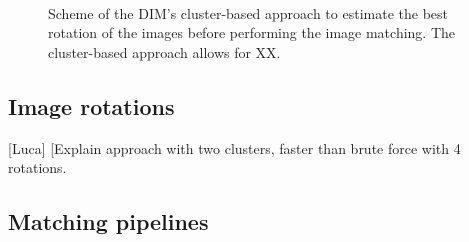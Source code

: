 \begin{figure}[ht]
  \centering
   \\
  \caption{Scheme of the DIM's cluster-based approach to estimate the best rotation of the images before performing the image matching. 
    The cluster-based approach allows for XX.
  }
  \label{fig:5:dim_rotations}
\end{figure}

\subsection{Image rotations}
[Luca] [Explain approach with two clusters, faster than brute force with 4 rotations. 

\subsection{Matching pipelines}

